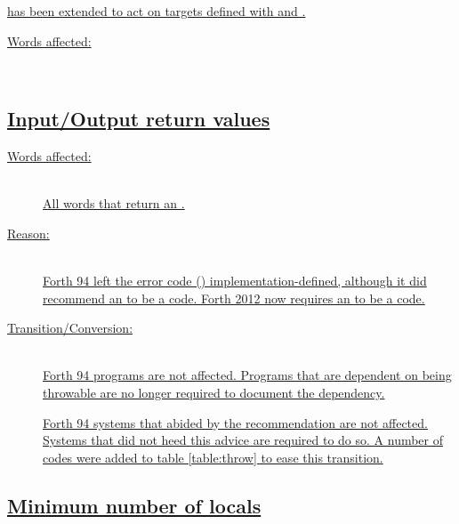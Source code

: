 \uline{ has been extended to act on targets defined with
 and .}

\begin{description}
\item[\uline{Words affected:}] ~\\
	\uline{}
\end{description}


\subsection[Input/Output return values]{\uline{Input/Output return values}} %
\label{diff:12:ior}

\begin{description}
\item[\uline{Words affected:}] ~\\
	\uline{All words that return an .}

\item[\uline{Reason:}] ~\\
	\uline{Forth 94 left the error code () implementation-defined,
	although it did recommend an  to be a 
	code.  Forth 2012 now requires an  to be a
	 code.}

\item[\uline{Transition/Conversion:}] ~\\
	\uline{Forth 94 programs are not affected.  Programs that are dependent
	on  being throwable are no longer required to document the
	dependency.}

	\uline{Forth 94 systems that abided by the recommendation are not
	affected.  Systems that did not heed this advice are required to do so.
	A number of  codes were added to table
	\ref{table:throw} to ease this transition.}
\end{description}


\subsection[Minimum number of locals]{\uline{Minimum number of locals}} %
\label{diff:12:locals}

